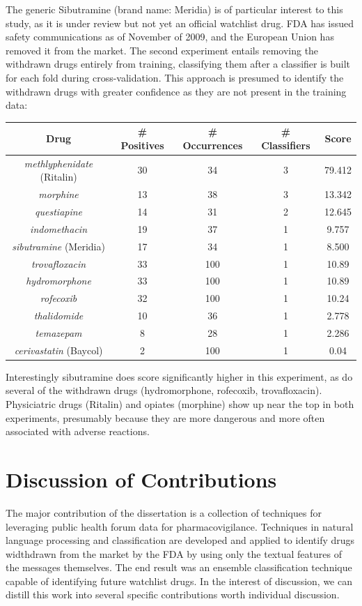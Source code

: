 \documentclass[twoside,11pt]{article}
\begin{document}
The generic Sibutramine (brand name: Meridia) is of particular interest to this study, as it is under review but not yet an official watchlist drug. FDA has issued safety communications as of November of 2009, and the European Union has removed it from the market.
The second experiment entails removing the withdrawn drugs entirely from training, classifying them after a classifier is built for each fold during cross-validation. This approach is presumed to identify the withdrawn drugs with greater confidence as they are not present in the training data:
\begin{center}
  \begin{tabular}{||c c c c c||}
    \hline
    Drug & # Positives & # Occurrences & # Classifiers & Score \\
    \hline\hline
    \textit{methlyphenidate} (Ritalin) & 30 & 34 & 3 & 79.412 \\
    \hline
    \textit{morphine} & 13 & 38 & 3 & 13.342 \\
    \hline
    \textit{questiapine} & 14 & 31 & 2 & 12.645 \\
    \hline
    \textit{indomethacin} & 19 & 37 & 1 & 9.757 \\
    \hline
    \textit{sibutramine} (Meridia) & 17 & 34 & 1 & 8.500\\
    \hline\hline
    \textit{trovafloxacin} & 33 & 100 & 1 & 10.89\\
    \hline
    \textit{hydromorphone} & 33 & 100 & 1 & 10.89\\
    \hline
    \textit{rofecoxib} & 32 & 100 & 1 & 10.24 \\
    \hline
    \textit{thalidomide} & 10 & 36 & 1 & 2.778\\
    \hline
    \textit{temazepam} & 8 & 28 & 1 & 2.286\\
    \hline
    \textit{cerivastatin} (Baycol) & 2 & 100 & 1 & 0.04\\
    \hline
  \end{tabular}
\end{center}
Interestingly sibutramine does score significantly higher in this experiment, as do several of the withdrawn drugs (hydromorphone, rofecoxib, trovafloxacin). Physiciatric drugs (Ritalin) and opiates (morphine) show up near the top in both experiments, presumably because they are more dangerous and more often associated with adverse reactions.

\section{Discussion of Contributions}
The major contribution of the dissertation is a collection of techniques for leveraging public health forum data for pharmacovigilance. Techniques in natural language processing and classification are developed and applied to identify drugs widthdrawn from the market by the FDA by using only the textual features of the messages themselves. The end result was an ensemble classification technique capable of identifying future watchlist drugs. In the interest of discussion, we can distill this work into several specific contributions worth individual discussion.
\end{document}
